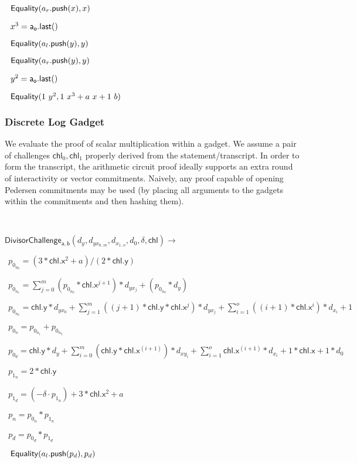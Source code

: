 \documentclass[]{article}
\begin{document}
	$~~\mathsf{Equality}(a_r\mathsf{.push}(x), x)$
	
	$~~x^3 = \mathsf{a_o.last()}$
	
	$~~\mathsf{Equality}(a_l\mathsf{.push}(y), y)$
	
	$~~\mathsf{Equality}(a_r\mathsf{.push}(y), y)$
	
	$~~y^2 = \mathsf{a_o.last()}$
	
	$~~\mathsf{Equality}(1 ~y^2, 1 ~x^3 + a ~x + 1 ~b)$

	\subsubsection{Discrete Log Gadget}
	
	\newcommand{\chl}{\mathsf{chl}}
	
	We evaluate the proof of scalar multiplication within a gadget. We assume a pair of challenges $\chl_0, \chl_1$ properly derived from the statement/transcript. In order to form the transcript, the arithmetic circuit proof ideally supports an extra round of interactivity or vector commitments. Naively, any proof capable of opening Pedersen commitments may be used (by placing all arguments to the gadgets within the commitments and then hashing them).
	
	\

	\newcommand{\dloglhs}{\mathsf{DivisorChallenge_{a,b}}}
	
	$\dloglhs(d_y, d_{yx_{0..m}}, d_{x_{1..o}}, d_0, \delta, \chl) \rightarrow$
	
	$~~p_{0_{n_0}} = (3 * \chl\mathsf{.x}^2 + a) / (2 * \chl\mathsf{.y})$
	
	$~~p_{0_{n_1}} = \sum^m_{j=0} (p_{0_{n_0}} * \chl\mathsf{.x}^{j+1}) * d_{yx_j} + (p_{0_{n_0}} * d_y)$
	
	$~~p_{0_{n_2}} = \chl\mathsf{.y} * d_{yx_0} + \sum^m_{j=1} ((j+1) * \chl\mathsf{.y} * \chl\mathsf{.x}^j) * d_{yx_j} + \sum^o_{i=1} ((i+1) * \chl\mathsf{.x}^i) * d_{x_i} + 1$
	
	$~~p_{0_n} = p_{0_{n_1}} + p_{0_{n_2}}$
	
	$~~p_{0_d} = \chl\mathsf{.y} * d_y + \sum^m_{i=0} (\chl\mathsf{.y} * \chl\mathsf{.x}^{(i+1)}) * d_{xy_{i}} + \sum^o_{i=1} \chl\mathsf{.x}^{(i+1)} * d_{x_{i}} + 1 * \chl\mathsf{.x} + 1 * d_0$
	
	$~~p_{1_n} = 2 * \chl\mathsf{.y}$
	
	$~~p_{1_d} = (-\delta \cdot p_{1_n}) + 3 * \chl\mathsf{.x}^2 + a$
	
	$~~p_n = p_{0_n} * p_{1_n}$
	
	$~~p_d = p_{0_d} * p_{1_d}$
	
	$~~\mathsf{Equality}(a_l\mathsf{.push}(p_d), p_d)$
	
\end{document}
